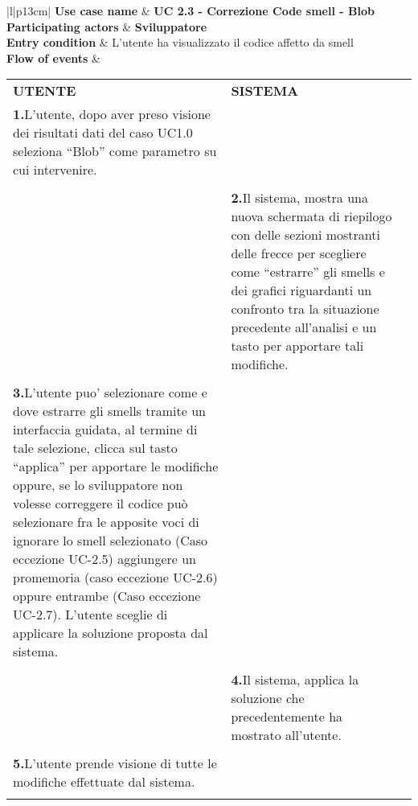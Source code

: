 		\begin{tabular}{|l|p{13cm}|}
			\hline
			\textbf{Use case name}  & \textbf{UC 2.3 - Correzione Code smell - Blob} \\ \hline
			\textbf{Participating actors}  & \textbf{Sviluppatore} \\ \hline
			\textbf{Entry condition}  & L’utente ha visualizzato il codice affetto da smell  \\  \hline
			\textbf{Flow of events}  &  
			\begin{tabular}{p{6cm}p{6cm}p{6cm}}
				\centering \textbf{UTENTE} & \centering \textbf{SISTEMA} & \\
				\textbf{1.}\hspace{0.3cm}L’utente, dopo aver preso visione dei risultati dati del caso UC1.0 seleziona “Blob” come parametro su cui intervenire.
				\\ \\ &
				\textbf{2.}\hspace{0.3cm}Il sistema, mostra una nuova schermata di riepilogo con delle sezioni mostranti delle frecce per scegliere come “estrarre” gli smells e dei grafici riguardanti un confronto tra la situazione precedente all’analisi e un tasto per apportare tali modifiche. \\ \\
				
				\textbf{3.}\hspace{0.3cm}L'utente puo' selezionare come e dove estrarre gli smells tramite un interfaccia guidata, al termine di tale selezione, clicca sul tasto “applica” per apportare le modifiche oppure, se lo sviluppatore non volesse correggere il codice può selezionare fra le apposite voci di ignorare lo smell selezionato (Caso eccezione UC-2.5) aggiungere un promemoria (caso eccezione UC-2.6) oppure entrambe (Caso eccezione   UC-2.7). L'utente sceglie di applicare la soluzione proposta dal sistema.
				\\ \\ &
				\textbf{4.}\hspace{0.3cm}Il sistema, applica la soluzione che precedentemente ha mostrato all'utente. \\ \\
				
				\textbf{5.}\hspace{0.3cm}L'utente prende visione di tutte le modifiche effettuate dal sistema. \\ \\
				
			\end{tabular}\\ \hline
			

\end{tabular}
